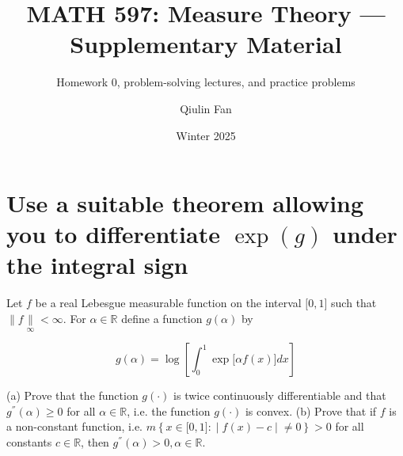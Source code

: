 \documentclass{qlnotes-export}
\title{MATH 597: Measure Theory --- Supplementary Material}
\subtitle{Homework 0, problem-solving lectures, and practice problems}
\author{Qiulin Fan}
\date{Winter 2025}
\begin{document}
\mainmatter
\chapter{\texorpdfstring{Use a suitable theorem allowing you to differentiate \(\exp(g)\) under the integral sign}{Use a suitable theorem allowing you to differentiate \textbackslash exp(g) under the integral sign}}\label{use-a-suitable-theorem-allowing-you-to-differentiate-exp-g-under-the-integral-sign}

Let \(f\) be a real Lebesgue measurable function on the interval \(\lbrack 0,1\rbrack\) such that \(\parallel f\underset{\infty}{\parallel} < \infty\). For \(\alpha \in {\mathbb{R}}\) define a function \(g(\alpha)\) by

\[g(\alpha) = \log\left\lbrack {\int_{0}^{1}\exp\lbrack\alpha f(x)\rbrack dx} \right\rbrack\]



(a) Prove that the function \(g( \cdot )\) is twice continuously differentiable and that \(g^{''}(\alpha) \geq 0\) for all \(\alpha \in {\mathbb{R}}\), i.e. the function \(g( \cdot )\) is convex. (b) Prove that if \(f\) is a non-constant function, i.e. \(m\left\{ x \in \lbrack 0,1\rbrack: \middle| f(x) - c \middle| \neq 0 \right\} > 0\) for all constants \(c \in {\mathbb{R}}\), then \(g^{''}(\alpha) > 0,\alpha \in {\mathbb{R}}\).
\end{document}

